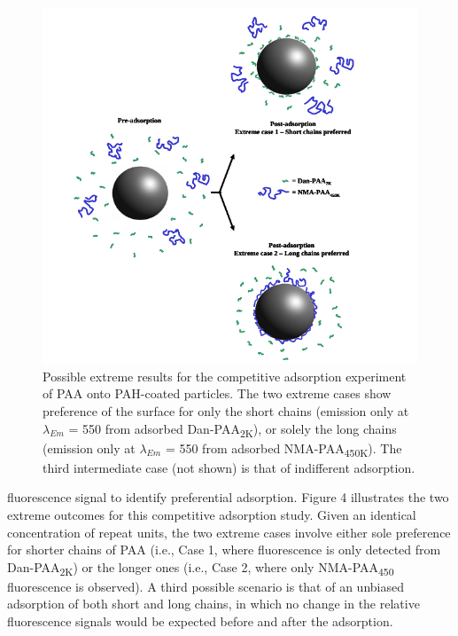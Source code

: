 \documentclass[journal=mamobx,manuscript=article]{achemso}
\begin{document}
\begin{figure}[H]
\includegraphics[scale=3.0]{fig4.png}
\caption{Possible extreme results for the competitive adsorption experiment of PAA onto PAH-coated particles.  The two extreme cases show preference of the surface for only the short chains (emission only at $\lambda_{Em}$ = 550 from adsorbed Dan-PAA\textsubscript{2K}), or solely the long chains (emission only at $\lambda_{Em}$ = 550 from adsorbed NMA-PAA\textsubscript{450K}).  The third intermediate case (not shown) is that of indifferent adsorption.}
\label{figure 4}
\end{figure}

fluorescence signal to identify preferential adsorption. Figure 4 illustrates the two extreme outcomes for this competitive adsorption study.  Given an identical concentration of repeat units, the two extreme cases involve either sole preference for shorter chains of PAA (i.e., Case 1, where fluorescence is only detected from Dan-PAA\textsubscript{2K}) or the longer ones (i.e., Case 2, where only NMA-PAA\textsubscript{450} fluorescence is observed).  A third possible scenario is that of an unbiased adsorption of both short and long chains, in which no change in the relative fluorescence signals would be expected before and after the adsorption. 
\end{document}
